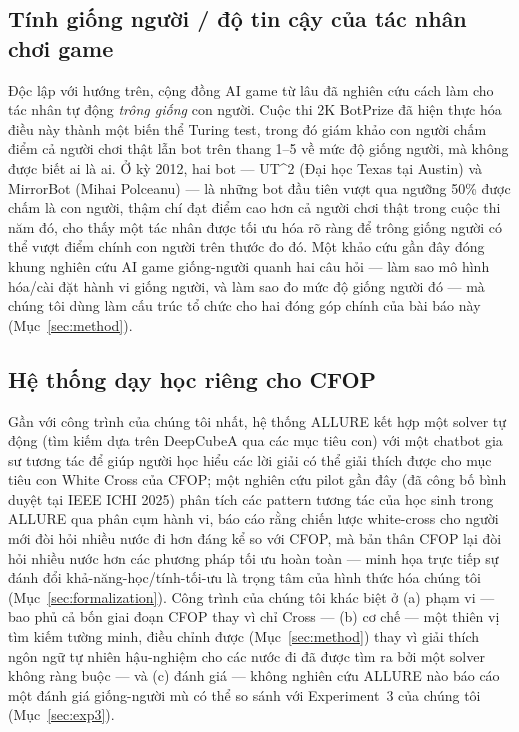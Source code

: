 \documentclass[10pt,conference]{article}
\begin{document}
\subsection{Tính giống người / độ tin cậy của tác nhân chơi game}
\label{sec:related-believability}
Độc lập với hướng trên, cộng đồng AI game từ lâu đã nghiên cứu cách làm
cho tác nhân tự động \emph{trông giống} con người. Cuộc thi 2K BotPrize
\citep{hingston2009} đã hiện thực hóa điều này thành một biến thể Turing
test, trong đó giám khảo con người chấm điểm cả người chơi thật lẫn bot
trên thang 1--5 về mức độ giống người, mà không được biết ai là ai.
Ở kỳ 2012, hai bot --- UT\^{}2 (Đại học Texas tại Austin) và MirrorBot
(Mihai Polceanu) --- là những bot đầu tiên vượt qua ngưỡng 50\% được
chấm là con người, thậm chí đạt điểm cao hơn cả người chơi thật trong
cuộc thi năm đó, cho thấy một tác nhân được tối ưu hóa rõ ràng để
trông giống người có thể vượt điểm chính con người trên thước đo đó. Một khảo cứu gần đây
\citep{humanlike2025} đóng khung nghiên cứu AI game giống-người quanh
hai câu hỏi — làm sao mô hình hóa/cài đặt hành vi giống người, và làm
sao đo mức độ giống người đó — mà chúng tôi dùng làm cấu trúc tổ chức
cho hai đóng góp chính của bài báo này (Mục~\ref{sec:method}).

\subsection{Hệ thống dạy học riêng cho CFOP}
\label{sec:related-allure}
Gần với công trình của chúng tôi nhất, hệ thống ALLURE \citep{allure}
kết hợp một solver tự động (tìm kiếm dựa trên DeepCubeA qua các mục
tiêu con) với một chatbot gia sư tương tác để giúp người học hiểu các
lời giải có thể giải thích được cho mục tiêu con White Cross của CFOP;
một nghiên cứu pilot gần đây \citep{vanacore2025} (đã công bố bình
duyệt tại IEEE ICHI 2025) phân tích các pattern tương tác của học sinh
trong ALLURE qua phân cụm hành vi, báo cáo rằng chiến lược white-cross
cho người mới đòi hỏi nhiều nước đi hơn đáng kể so với CFOP, mà bản
thân CFOP lại đòi hỏi nhiều nước hơn các phương pháp tối ưu hoàn toàn —
minh họa trực tiếp sự đánh đổi khả-năng-học/tính-tối-ưu là trọng tâm
của hình thức hóa chúng tôi (Mục~\ref{sec:formalization}). Công trình
của chúng tôi khác biệt ở (a) phạm vi — bao phủ cả bốn giai đoạn CFOP
thay vì chỉ Cross — (b) cơ chế — một thiên vị tìm kiếm tường minh, điều
chỉnh được (Mục~\ref{sec:method}) thay vì giải thích ngôn ngữ tự nhiên
hậu-nghiệm cho các nước đi đã được tìm ra bởi một solver không ràng
buộc — và (c) đánh giá — không nghiên cứu ALLURE nào báo cáo một đánh
giá giống-người mù có thể so sánh với Experiment~3 của chúng tôi
(Mục~\ref{sec:exp3}).
\end{document}
